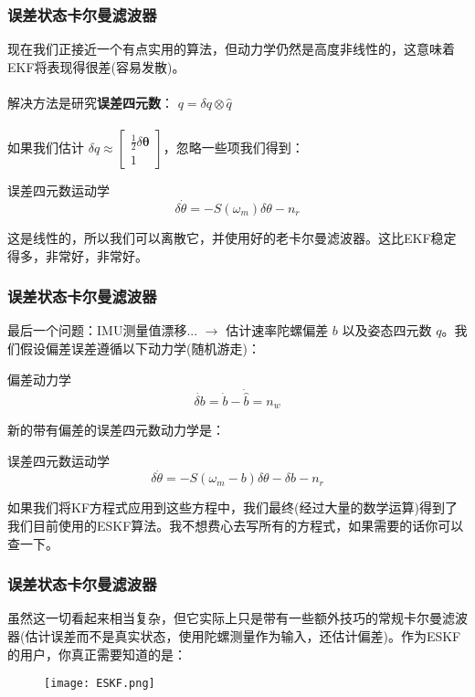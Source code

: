 \documentclass{beamer}
\begin{document}
\begin{frame}
    \frametitle{误差状态卡尔曼滤波器}
    现在我们正接近一个有点实用的算法，但动力学仍然是高度非线性的，这意味着EKF将表现得很差(容易发散)。\\~\\

    解决方法是研究\textbf{误差四元数}： $q=\delta q \otimes \hat{q}$\\~\\

    如果我们估计 $\delta q \approx \left[\begin{array}{c}{\frac{1}{2} \delta \boldsymbol{\theta}} \\ {1}\end{array}\right]$，忽略一些项我们得到：
        \begin{block}{误差四元数运动学}
            \begin{equation}
                \delta \dot{\theta}=-S\left(\omega_{m}\right) \delta \theta-n_r
            \end{equation}
        \end{block}
    这是线性的，所以我们可以离散它，并使用好的老卡尔曼滤波器。这比EKF稳定得多，非常好，非常好。
\end{frame}


\begin{frame}
    \frametitle{误差状态卡尔曼滤波器}
    最后一个问题：IMU测量值漂移... $\rightarrow$ 估计速率陀螺偏差 $b$ 以及姿态四元数 $q$。我们假设偏差误差遵循以下动力学(随机游走)：
    \begin{block}{偏差动力学}
        \begin{equation}
            \dot{\delta b}=\dot{b}-\dot{\hat{b}}=n_{w}
        \end{equation}
    \end{block}
    新的带有偏差的误差四元数动力学是：
    \begin{block}{误差四元数运动学}
        \begin{equation}
            \delta \dot{\theta}=-S\left(\omega_{m}-b\right) \delta \theta-\delta b-n_r
        \end{equation}
    \end{block}
    如果我们将KF方程式应用到这些方程中，我们最终(经过大量的数学运算)得到了我们目前使用的ESKF算法。我不想费心去写所有的方程式，如果需要的话你可以查一下。
\end{frame}

\begin{frame}
    \frametitle{误差状态卡尔曼滤波器}
    虽然这一切看起来相当复杂，但它实际上只是带有一些额外技巧的常规卡尔曼滤波器(估计误差而不是真实状态，使用陀螺测量作为输入，还估计偏差)。作为ESKF的用户，你真正需要知道的是：
    \begin{figure}
        \texttt{[image: ESKF.png]}
    \end{figure}
\end{frame}
\end{document}
